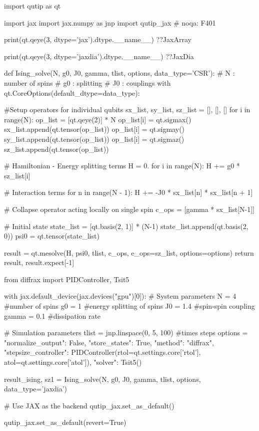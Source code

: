import qutip as qt

import jax
import jax.numpy as jnp
import qutip_jax  # noqa: F401

print(qt.qeye(3, dtype='jax').dtype.__name__)
?\pythonoutput?JaxArray

print(qt.qeye(3, dtype='jaxdia').dtype.__name__)
?\pythonoutput?JaxDia

def Ising_solve(N, g0, J0, gamma, tlist, options, data_type='CSR'):
    # N  : number of spins
    # g0 : splitting
    # J0 : couplings
    with qt.CoreOptions(default_dtype=data_type):

        #Setup operators for individual qubits
        sx_list, sy_list, sz_list = [], [], []
        for i in range(N):
            op_list = [qt.qeye(2)] * N
            op_list[i] = qt.sigmax()
            sx_list.append(qt.tensor(op_list))
            op_list[i] = qt.sigmay()
            sy_list.append(qt.tensor(op_list))
            op_list[i] = qt.sigmaz()
            sz_list.append(qt.tensor(op_list))

        # Hamiltonian - Energy splitting terms
        H = 0.
        for i in range(N):
            H += g0 * sz_list[i]

        # Interaction terms
        for n in range(N - 1):
            H += -J0 * sx_list[n] * sx_list[n + 1]

        # Collapse operator acting locally on single spin
        c_ops = [gamma * sx_list[N-1]]

        # Initial state
        state_list = [qt.basis(2, 1)] * (N-1)
        state_list.append(qt.basis(2, 0))
        psi0 = qt.tensor(state_list)

        result = qt.mesolve(H, psi0, tlist, c_ops, e_ops=sz_list, options=options)
        return result, result.expect[-1]


from diffrax import PIDController, Tsit5

with jax.default_device(jax.devices("gpu")[0]):
    # System parameters
    N = 4 #number of spins
    g0 = 1 #energy splitting of spins
    J0 = 1.4 #spin-spin coupling
    gamma = 0.1 #dissipation rate

    # Simulation parameters
    tlist = jnp.linspace(0, 5, 100) #times steps
    options = {
        "normalize_output": False,
        "store_states": True,
        "method": "diffrax",
        "stepsize_controller": PIDController(rtol=qt.settings.core['rtol'],
                                             atol=qt.settings.core['atol']),
        "solver": Tsit5()
    }

    result_ising, sz1 = Ising_solve(N, g0, J0, gamma, tlist, options, data_type='jaxdia')



# Use JAX as the backend
qutip_jax.set_as_default()


qutip_jax.set_as_default(revert=True)